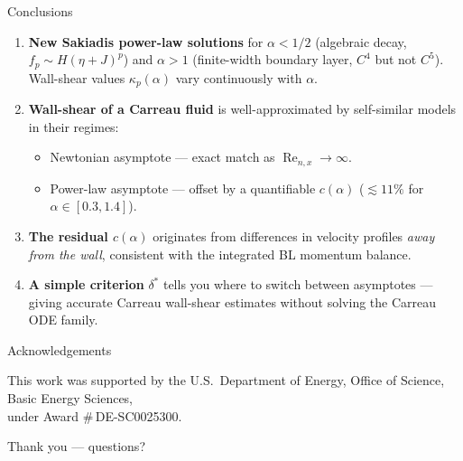 \documentclass[10pt,aspectratio=169]{beamer}
\renewcommand{\Re}{\operatorname{Re}}
\newcommand{\Renx}{\Re_{n,x}}
\begin{document}
\begin{frame}{Conclusions}
  \begin{enumerate}
    \item \textbf{New Sakiadis power-law solutions} for $\alpha<1/2$ (algebraic decay, $f_p\sim H(\eta+J)^p$)
          and $\alpha>1$ (finite-width boundary layer, $C^4$ but not $C^5$). Wall-shear values $\kappa_p(\alpha)$ vary continuously with $\alpha$.
    \item \textbf{Wall-shear of a Carreau fluid} is well-approximated by self-similar models in their regimes:
          \begin{itemize}
            \item Newtonian asymptote --- exact match as $\Renx\to\infty$.
            \item Power-law asymptote --- offset by a quantifiable $c(\alpha)$ ($\lesssim 11\%$ for $\alpha\in[0.3,1.4]$).
          \end{itemize}
    \item \textbf{The residual $c(\alpha)$} originates from differences in velocity profiles \emph{away from the wall},
          consistent with the integrated BL momentum balance.
    \item \textbf{A simple criterion} $\delta^*$ tells you where to switch between asymptotes ---
          giving accurate Carreau wall-shear estimates without solving the Carreau ODE family.
  \end{enumerate}
\end{frame}

\begin{frame}{Acknowledgements}
  \begin{center}
    This work was supported by the U.S.\ Department of Energy, Office of Science, Basic Energy Sciences,\\
    under Award \#\,DE-SC0025300.
    \vspace{1.5em}

    \Large Thank you --- questions?
  \end{center}
\end{frame}
\end{document}
